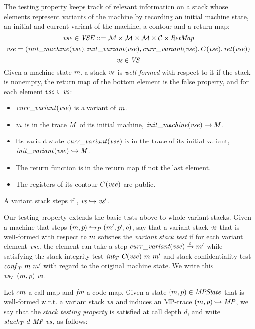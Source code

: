 \documentclass[acmsmall,review,anonymous]{acmart}\settopmatter{printfolios=true,printccs=false,printacmref=false}
\begin{document}
  The testing property keeps track of relevant information on a stack whose
  elements represent variants of the machine by recording an initial machine
  state, an initial and current variant of the machine, a contour and a return
  map:
%
  $$\mathit{vse} \in \mathit{VSE} ::= {\mathcal M} \times {\mathcal M} \times {\mathcal M} \times {\mathcal C} \times \mathit{RetMap}$$
  $$\mathit{vse} = (\mathit{init\_machine}(\mathit{vse}), \mathit{init\_variant}(\mathit{vse}), \mathit{curr\_variant}(\mathit{vse}), C(\mathit{vse}), \mathit{ret}(\mathit{vse}))$$
  $$\mathit{vs} \in \mathit{VS}$$
%
  Given a machine state $m$, a stack $\mathit{vs}$ is \emph{well-formed} with
  respect to it if the stack is nonempty, the return map of the bottom element
  is the false property, and for each element $\mathit{vse} \in \mathit{vs}$:
  \begin{itemize}
  \item $\mathit{curr\_variant}(\mathit{vse})$ is a variant of $m$.
  \item $m$ is in the trace $M$ of its initial machine,
    $\mathit{init\_machine}(\mathit{vse}) \hookrightarrow M$.
  \item Its variant state $\mathit{curr\_variant}(\mathit{vse})$
    is in the trace of its initial variant,
    $\mathit{init\_variant}(\mathit{vse}) \hookrightarrow M$.
  \item The return function is in the return map if not the last element. 
  \item The registers of its contour $C(\mathit{vse})$ are public.
  \end{itemize}
%
  A variant stack steps if , $\mathit{vs}
  \hookrightarrow \mathit{vs}'$.

%
  Our testing property extends the basic tests above to whole variant stacks.
  Given a machine that steps $(m, p) \hookrightarrow_P (m', p',
  o)$, say that a variant stack $\mathit{vs}$ that is well-formed with respect to
  $m$ safisfies the \emph{variant stack test} if for each variant element
  $\mathit{vse}$, the element can take a step $\mathit{curr\_variant}(\mathit{vse})
  \xrightarrow{o} m'$ while satisfying the stack integrity test
  $\mathit{int}_T ~ C(\mathit{vse}) ~ m ~ m'$ and stack confidentiality
  test $\mathit{conf}_T ~ m ~ m'$ with regard to the original machine
  state. We write this $\mathit{\mathit{vs}}_T ~ (m, p) ~ \mathit{vs}$.

%
  Let $cm$ a call map and $\mathit{fm}$ a code map. Given a state $(m,
  p) \in \mathit{MPState}$ that is well-formed w.r.t. a variant stack $\mathit{vs}$ and induces
  an MP-trace $(m, p) \hookrightarrow \mathit{MP}$, we say that the \emph{stack
  testing property} is satisfied at call depth $d$, and write
  $\mathit{stack}_T ~ d ~ \mathit{MP} ~ \mathit{vs}$, as follows:
\end{document}
